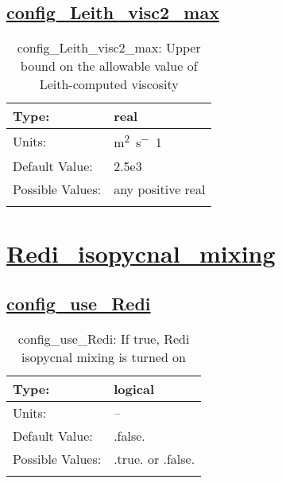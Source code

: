 \subsection[config\_Leith\_visc2\_max]{\hyperref[sec:nm_tab_hmix_Leith]{config\_Leith\_visc2\_max}}
\label{subsec:nm_sec_config_Leith_visc2_max}
\begin{center}
\begin{longtable}{| p{2.0in} || p{4.0in} |}
    \hline
    Type: & real \\
    \hline
    Units: & \si{m^2.s^-1} \\
    \hline
    Default Value: & 2.5e3 \\
    \hline
    Possible Values: & any positive real \\
    \hline
    \caption{config\_Leith\_visc2\_max: Upper bound on the allowable value of Leith-computed viscosity}
\end{longtable}
\end{center}
\section[Redi\_isopycnal\_mixing]{\hyperref[sec:nm_tab_Redi_isopycnal_mixing]{Redi\_isopycnal\_mixing}}
\label{sec:nm_sec_Redi_isopycnal_mixing}
\subsection[config\_use\_Redi]{\hyperref[sec:nm_tab_Redi_isopycnal_mixing]{config\_use\_Redi}}
\label{subsec:nm_sec_config_use_Redi}
\begin{center}
\begin{longtable}{| p{2.0in} || p{4.0in} |}
    \hline
    Type: & logical \\
    \hline
    Units: & -- \\
    \hline
    Default Value: & .false. \\
    \hline
    Possible Values: & .true. or .false. \\
    \hline
    \caption{config\_use\_Redi: If true, Redi isopycnal mixing is turned on}
\end{longtable}
\end{center}
